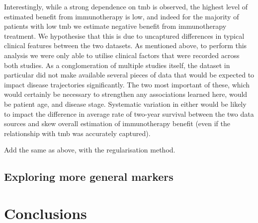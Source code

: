 \documentclass[../thesis.tex]{subfiles}
\begin{document}
Interestingly, while a strong dependence on \gls{tmb} is observed, the highest level of estimated benefit from immunotherapy is low, and indeed for the majority of patients with low \gls{tmb} we estimate negative benefit from immunotherapy treatment. We hypothesise that this is due to uncaptured differences in typical clinical features between the two datasets. As mentioned above, to perform this analysis we were only able to utilise clinical factors that were recorded across both studies. As a conglomeration of multiple studies itself, the \citet{zehir_mutational_2017} dataset in particular did not make available several pieces of data that would be expected to impact disease trajectories significantly. The two most important of these, which would certainly be necessary to strengthen any associations learned here, would be patient age, and disease stage. Systematic variation in either would be likely to impact the difference in average rate of two-year survival between the two data sources and skew overall estimation of immunotherapy benefit (even if the relationship with \gls{tmb} was accurately captured).


{\color{red} Add the same as above, with the regularisation method.}

\subsection{Exploring more general markers}

\section{Conclusions}


\dobib %
\end{document}
